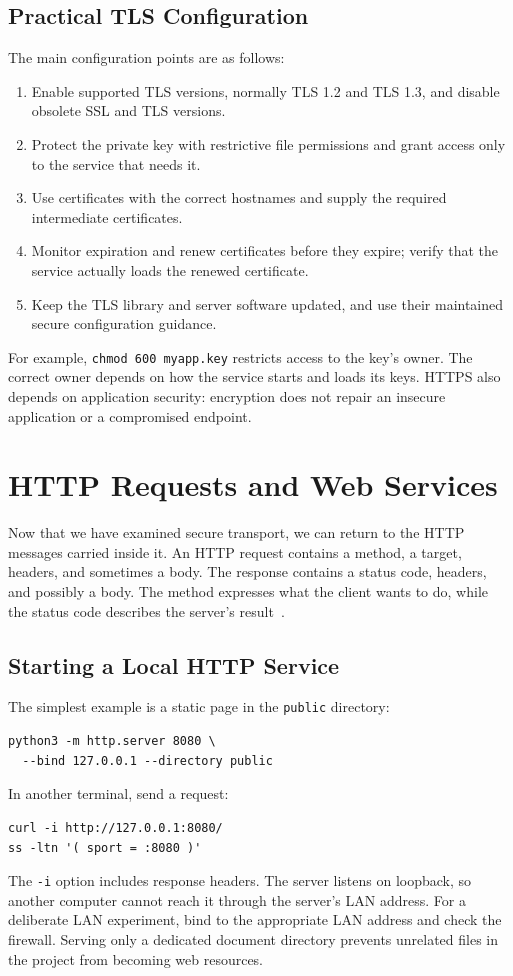 \documentclass[journal]{IEEEtran}
\begin{document}
\subsection{Practical TLS Configuration}
The main configuration points are as follows:
\begin{enumerate}
    \item Enable supported TLS versions, normally TLS 1.2 and TLS 1.3, and disable obsolete SSL and TLS versions.
    \item Protect the private key with restrictive file permissions and grant access only to the service that needs it.
    \item Use certificates with the correct hostnames and supply the required intermediate certificates.
    \item Monitor expiration and renew certificates before they expire; verify that the service actually loads the renewed certificate.
    \item Keep the TLS library and server software updated, and use their maintained secure configuration guidance.
\end{enumerate}
For example, \texttt{chmod 600 myapp.key} restricts access to the key's owner. The correct owner depends on how the service starts and loads its keys. HTTPS also depends on application security: encryption does not repair an insecure application or a compromised endpoint.

\section{HTTP Requests and Web Services}
Now that we have examined secure transport, we can return to the HTTP messages carried inside it. An HTTP request contains a method, a target, headers, and sometimes a body. The response contains a status code, headers, and possibly a body. The method expresses what the client wants to do, while the status code describes the server's result~\cite{httpsemantics}.

\subsection{Starting a Local HTTP Service}
The simplest example is a static page in the \texttt{public} directory:
\begin{lstlisting}
python3 -m http.server 8080 \
  --bind 127.0.0.1 --directory public
\end{lstlisting}
In another terminal, send a request:
\begin{lstlisting}
curl -i http://127.0.0.1:8080/
ss -ltn '( sport = :8080 )'
\end{lstlisting}
The \texttt{-i} option includes response headers. The server listens on loopback, so another computer cannot reach it through the server's LAN address. For a deliberate LAN experiment, bind to the appropriate LAN address and check the firewall. Serving only a dedicated document directory prevents unrelated files in the project from becoming web resources.
\end{document}
